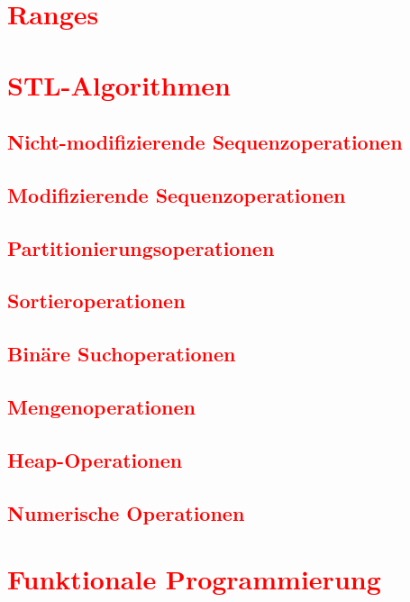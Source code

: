 \section{\textcolor{red}{Ranges}}\label{sec:ranges}
\section{\textcolor{red}{STL-Algorithmen}}\label{sec:stl-algorithms}
\subsection{\textcolor{red}{Nicht-modifizierende Sequenzoperationen}}\label{sec:non-modifying-sequence-operations}
\subsection{\textcolor{red}{Modifizierende Sequenzoperationen}}\label{sec:modifying-sequence-operations}
\subsection{\textcolor{red}{Partitionierungsoperationen}}\label{sec:partitioning-operations}
\subsection{\textcolor{red}{Sortieroperationen}}\label{sec:sorting-operations}
\subsection{\textcolor{red}{Binäre Suchoperationen}}\label{sec:binary-search-operations}
\subsection{\textcolor{red}{Mengenoperationen}}\label{sec:set-operations}
\subsection{\textcolor{red}{Heap-Operationen}}\label{sec:heap-operations}
\subsection{\textcolor{red}{Numerische Operationen}}\label{sec:numeric-operations}
\section{\textcolor{red}{Funktionale Programmierung}}\label{sec:functional-programming}
